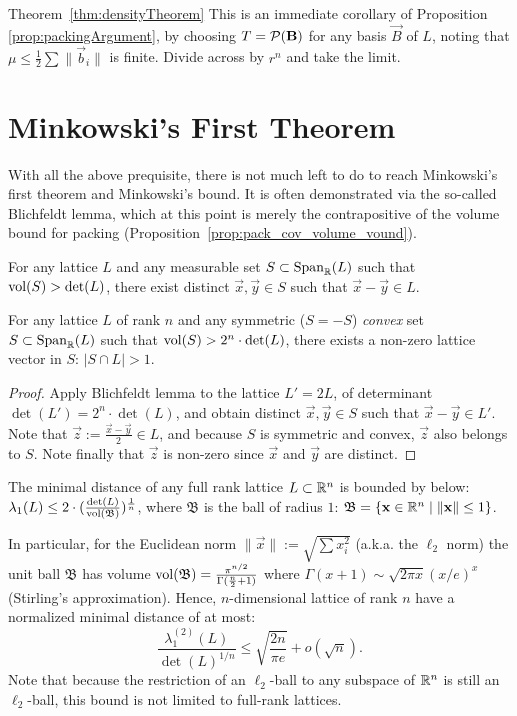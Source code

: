 \begin{proofof}{Theorem~\ref{thm:densityTheorem}}
This is an immediate corollary of Proposition \ref{prop:packingArgument}, by choosing $T = \mathcal P(\mathbf{B})$ for any basis $\vec B$ of $L$, noting that $\mu \leq \frac 1 2 \sum \|\vec b_i\|$ is finite. 
Divide across by $r^n$ and take the limit.
\end{proofof}

\section{Minkowski's First Theorem}

With all the above prequisite, there is not much left to do to reach Minkowski's first theorem and Minkowski's bound. It is often demonstrated via the so-called Blichfeldt lemma, which at this point is merely the contrapositive of the volume bound for packing (Proposition~\ref{prop:pack_cov_volume_vound}).

\begin{lemma}[Blichfeldt] For any lattice $L$ and any measurable set $S \subset \operatorname{Span}_{\mathbb{R}}(L)$ such that $\mathrm{vol}(S) > \mathrm{det}(L)$, there exist distinct $\vec x, \vec y \in S$ such that $\vec x - \vec y \in L$.
\end{lemma}

\begin{theorem}  For any lattice $L$ of rank $n$ and any symmetric ($S = -S$) {\em convex} set $S \subset \operatorname{Span}_{\mathbb{R}}(L)$ such that $\mathrm{vol}(S) > 2^n \cdot \mathrm{det}(L)$, there exists a non-zero lattice vector in $S$: $|S \cap L| > 1$.
\end{theorem}
\begin{proof} Apply Blichfeldt lemma to the lattice $L' = 2 L$, of determinant $\det(L') = 2^n \cdot \det(L)$, and obtain distinct $\vec x, \vec y \in S$ such that $\vec x - \vec y \in L'$. Note that $\vec z := \frac {\vec x - \vec y} 2 \in L$, and because $S$ is symmetric and convex, $\vec z$ also belongs to $S$. Note finally that $\vec z$ is non-zero since $\vec x$ and $\vec y$ are distinct.
\end{proof}

\begin{theorem} The minimal distance of any full rank lattice $L \subset \mathbb{R}^n$ is bounded by below: $\lambda_1(L) \leq	2 \cdot (\frac {\mathrm{det}(L)} {\mathrm{vol}(\mathfrak B)})^{\frac 1 n}$, where $\mathfrak B$ is the ball of radius $1$: $\mathfrak B = \left\{\mathbf{x} \in \mathbb{R}^n \mid \|\mathbf{x}\| \leq 1 \right\}$.
\end{theorem}

In particular, for the Euclidean norm $\|\vec x\| := \sqrt{\sum x_i^2}$ (a.k.a. the $\ell_2$ norm) the unit ball $\mathfrak B$ has volume $\mathrm{vol}(\mathfrak B) = \frac {\pi^{n/2}} {\Gamma(\frac n 2 + 1)}$ where $\Gamma(x+1) \sim \sqrt{2 \pi x} (x/e)^x$ (Stirling's approximation).
Hence, $n$-dimensional lattice of rank $n$ have a normalized minimal distance of at most:
\[ \frac {\lambda_1^{(2)} (L)} {\det(L)^{1/n}} \leq \sqrt{\frac {2n} {\pi e}} + o(\sqrt n). \]
Note that because the restriction of an $\ell_2$-ball to any subspace of $\mathbb{R}^n$ is still an $\ell_2$-ball, this bound is not limited to full-rank lattices. 


